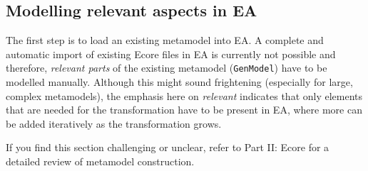 \subsection{Modelling relevant aspects in EA}
\genHeader

The first step is to load an existing metamodel into EA. A complete and automatic import of existing Ecore files in EA is currently not possible and therefore,
\emph{relevant parts} of the existing metamodel (\texttt{GenModel}) have to be modelled manually. Although this might sound frightening (especially for
large, complex metamodels), the emphasis here on \emph{relevant} indicates that only elements that are needed for the transformation have to be present in
EA, where more can be added iteratively as the transformation grows. 

If you find this section challenging or unclear, refer to Part II: Ecore for a detailed review of metamodel construction.

